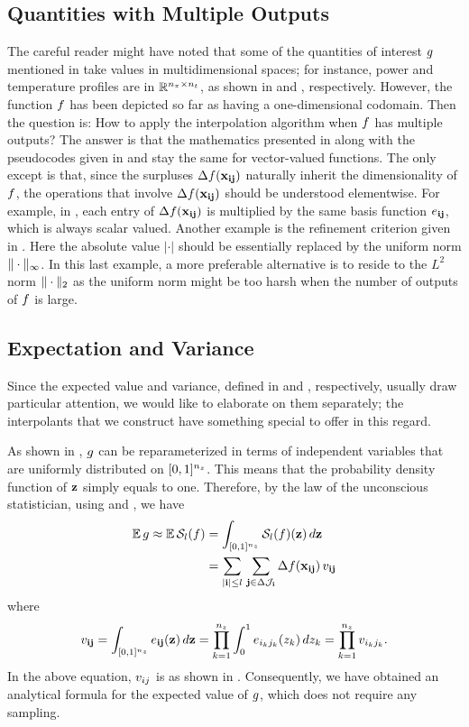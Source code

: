 \subsection{Quantities with Multiple Outputs}
The careful reader might have noted that some of the quantities of interest $g$
mentioned in  take values in multidimensional spaces; for
instance, power and temperature profiles are in $\mathbb{R}^{{n_\pi} \times {n_t}}$, as
shown in  and , respectively.
However, the function $f$ has been depicted so far as having a one-dimensional
codomain. Then the question is: How to apply the interpolation algorithm when
$f$ has multiple outputs? The answer is that the mathematics presented in
 along with the pseudocodes given in  and
 stay the same for vector-valued functions. The only except is
that, since the surpluses $\Delta f(\mathbf{x}_{\mathbf{i}\mathbf{j}})$ naturally inherit the
dimensionality of $f$, the operations that involve $\Delta f(\mathbf{x}_{\mathbf{i}\mathbf{j}})$
should be understood elementwise. For example, in ,
each entry of $\Delta f(\mathbf{x}_{\mathbf{i}\mathbf{j}})$ is multiplied by the same basis function
$e_{\mathbf{i}\mathbf{j}}$, which is always scalar valued. Another example is the refinement
criterion given in . Here the absolute value $|\cdot|$ should be
essentially replaced by the uniform norm $\| \cdot \|_\infty$. In this last
example, a more preferable alternative is to reside to the $L^2$ norm
$\| \cdot \|_2$ as the uniform norm might be too harsh when the number of
outputs of $f$ is large.

\subsection{Expectation and Variance} 
Since the expected value and variance, defined in  and
, respectively, usually draw particular attention, we would like
to elaborate on them separately; the interpolants that we construct have
something special to offer in this regard.

As shown in , $g$ can be reparameterized in terms of
independent variables that are uniformly distributed on $[0, 1]^{n_z}$. This means
that the probability density function of $\mathbf{z}$ simply equals to one. Therefore,
by the law of the unconscious statistician, using  and
, we have
\begin{align*}
  \mathbb{E} \, g \approx \mathbb{E} \, \mathcal{S}_{l}(f) &= \int_{[0, 1]^{n_z}} \mathcal{S}_{l}(f)(\mathbf{z}) \, d\mathbf{z} \\
  &= \sum_{|\mathbf{i}| \leq l} \, \sum_{\mathbf{j} \in \Delta\mathcal{J}_{\mathbf{i}}} \Delta f(\mathbf{x}_{\mathbf{i}\mathbf{j}}) \, v_{\mathbf{i}\mathbf{j}}
\end{align*}
where
\[
  v_{\mathbf{i}\mathbf{j}} = \int_{[0, 1]^{n_z}} e_{\mathbf{i}\mathbf{j}}(\mathbf{z}) \, d\mathbf{z} = \prod_{k = 1}^{{n_z}} \int_0^1 e_{i_k j_k}(z_k) \, dz_k = \prod_{k = 1}^{{n_z}} v_{i_k j_k}.
\]
In the above equation, $v_{ij}$ is as shown in . Consequently, we
have obtained an analytical formula for the expected value of $g$, which does
not require any sampling.

